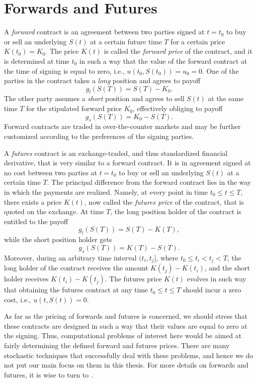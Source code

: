 \documentclass{UUThesisTemplate}
\begin{document}
\section{Forwards and Futures}
\label{sec:futures}
\par A \emph{forward} contract is an agreement between two parties signed at $t=t_0$ to buy or sell an underlying $S(t)$ at a certain future time $T$ for a certain price $K(t_0)=K_0$. The price $K(t)$ is called the \emph{forward price} of the contract, and it is determined at time $t_0$ in such a way that the value of the forward contract at the time of signing is equal to zero, i.e., $u(t_0,S(t_0))=u_0=0$. One of the parties in the contract takes a \emph{long} position and agrees to payoff 
$$g_l(S(T))=S(T)-K_0.$$
The other party assumes a \emph{short} position and agrees to sell $S(t)$ at the same time $T$ for the stipulated forward price $K_0$, effectively obliging to payoff 
$$g_s(S(T))=K_0-S(T).$$
Forward contracts are traded in over-the-counter markets and may be further customized according to the preferences of the signing parties.
\par A \emph{futures} contract is an exchange-traded, and thus standardized financial derivative, that is very similar to a forward contract. It is in agreement signed at no cost between two parties at $t=t_0$ to buy or sell an underlying $S(t)$ at a certain time $T$. The principal difference from the forward contract lies in the way in which the payments are realized. Namely, at every point in time $t_0 \leq t \leq T$, there exists a price $K(t)$, now called the \emph{futures price} of the contract, that is quoted on the exchange. At time $T$, the long position holder of the contract is entitled to the payoff 
$$g_l(S(T))=S(T)-K(T),$$
while the short position holder gets 
$$g_s(S(T))=K(T)-S(T).$$
Moreover, during an arbitrary time interval $(t_i,t_j]$, where $t_0 \leq t_i < t_j < T$, the long holder of the contract receives the amount $K(t_j)-K(t_i)$, and the short holder receives $K(t_i)-K(t_j)$. The futures price $K(t)$ evolves in such way that obtaining the futures contract at any time $t_0 \leq t \leq T$ should incur a zero cost, i.e., $u(t,S(t))=0$. 
\par As far as the pricing of forwards and futures is concerned, we should stress that these contracts are designed in such a way that their values are equal to zero at the signing. Thus, computational problems of interest here would be aimed at fairly determining the defined forward and futures prices. There are many stochastic techniques that successfully deal with these problems, and hence we do not put our main focus on them in this thesis. For more details on forwards and futures, it is wise to turn to \cite{hull2017options,duffie1989futures}.  
%
\end{document}
